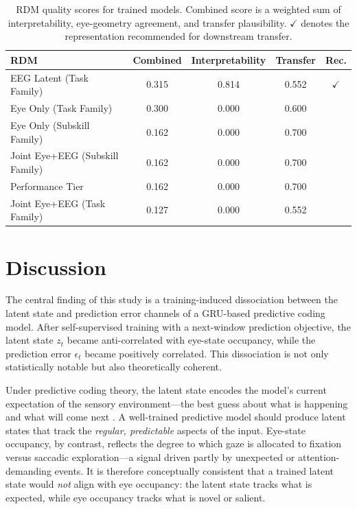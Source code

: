 \documentclass[11pt, letterpaper]{article}
\begin{document}
\begin{table}[H]
\centering
\caption{RDM quality scores for trained models. Combined score is a weighted sum of
interpretability, eye-geometry agreement, and transfer plausibility.
$\checkmark$ denotes the representation recommended for downstream transfer.}
\label{tab:rdm_quality}
\begin{tabular}{lcccc}
\toprule
\textbf{RDM} & \textbf{Combined} & \textbf{Interpretability} & \textbf{Transfer} & \textbf{Rec.} \\
\midrule
EEG Latent (Task Family)         & 0.315 & 0.814 & 0.552 & $\checkmark$ \\
Eye Only (Task Family)           & 0.300 & 0.000 & 0.600 & \\
Eye Only (Subskill Family)       & 0.162 & 0.000 & 0.700 & \\
Joint Eye+EEG (Subskill Family)  & 0.162 & 0.000 & 0.700 & \\
Performance Tier                 & 0.162 & 0.000 & 0.700 & \\
Joint Eye+EEG (Task Family)      & 0.127 & 0.000 & 0.552 & \\
\bottomrule
\end{tabular}
\end{table}

\section{Discussion}

The central finding of this study is a training-induced dissociation between the latent
state and prediction error channels of a GRU-based predictive coding model. After
self-supervised training with a next-window prediction objective, the latent state $z_t$
became anti-correlated with eye-state occupancy, while the prediction error $\epsilon_t$
became positively correlated. This dissociation is not only statistically notable but
also theoretically coherent.

Under predictive coding theory, the latent state encodes the model's current
expectation of the sensory environment---the best guess about what is happening and
what will come next \citep{whittington2019theories}. A well-trained predictive model
should produce latent states that track the \textit{regular, predictable} aspects of
the input. Eye-state occupancy, by contrast, reflects the degree to which gaze is
allocated to fixation versus saccadic exploration---a signal driven partly by
unexpected or attention-demanding events. It is therefore conceptually consistent that
a trained latent state would \textit{not} align with eye occupancy: the latent state
tracks what is expected, while eye occupancy tracks what is novel or salient.
\end{document}
